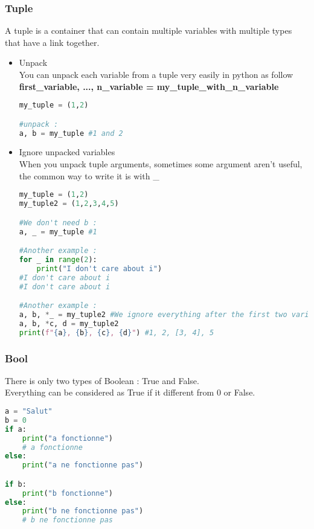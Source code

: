 \documentclass[a4paper, 12pt]{article}
\begin{document}
\subsubsection{Tuple}
A tuple is a container that can contain multiple variables with multiple types that have a link together. \\
\begin{itemize}
\item Unpack \\
You can unpack each variable from a tuple very easily in python as follow \textbf{first\_variable, ..., n\_variable = my\_tuple\_with\_n\_variable}
\begin{lstlisting}[language=Python]
my_tuple = (1,2)

#unpack :
a, b = my_tuple #1 and 2
\end{lstlisting}

\item Ignore unpacked variables \\
When you unpack tuple arguments, sometimes some argument aren't useful, the common way to write it is with \_
\begin{lstlisting}[language=Python]
my_tuple = (1,2)
my_tuple2 = (1,2,3,4,5)

#We don't need b :
a, _ = my_tuple #1

#Another example :
for _ in range(2):
	print("I don't care about i")
#I don't care about i
#I don't care about i

#Another example :
a, b, *_ = my_tuple2 #We ignore everything after the first two variables, the rest is stored in a list.
a, b, *c, d = my_tuple2 
print(f"{a}, {b}, {c}, {d}") #1, 2, [3, 4], 5
\end{lstlisting}
\end{itemize}


\subsubsection{Bool}
\label{subsec:Bool}
There is only two types of Boolean : True and False. \\
Everything can be considered as True if it different from 0 or False. \\
\begin{lstlisting}[language=Python]
a = "Salut"
b = 0
if a:
	print("a fonctionne")
	# a fonctionne
else:
	print("a ne fonctionne pas")

if b:
	print("b fonctionne")
else:
	print("b ne fonctionne pas")
	# b ne fonctionne pas
\end{lstlisting}
\end{document}
